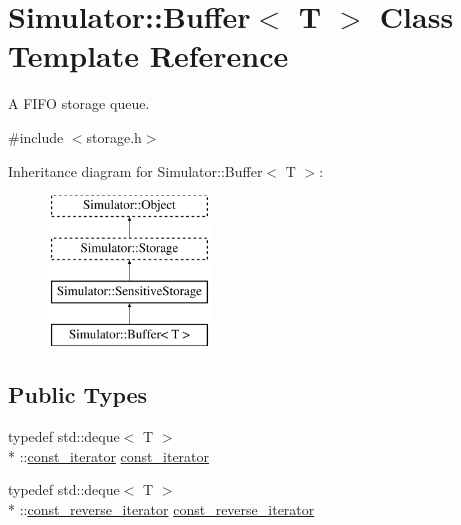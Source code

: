 \hypertarget{class_simulator_1_1_buffer}{\section{Simulator\+:\+:Buffer$<$ T $>$ Class Template Reference}
\label{class_simulator_1_1_buffer}
}


A F\+I\+F\+O storage queue.  




{\ttfamily \#include $<$storage.\+h$>$}

Inheritance diagram for Simulator\+:\+:Buffer$<$ T $>$\+:\begin{figure}[H]
\begin{center}
\leavevmode
\includegraphics[height=4.000000cm]{class_simulator_1_1_buffer}
\end{center}
\end{figure}
\subsection*{Public Types}
\begin{DoxyCompactItemize}
\item 
typedef std\+::deque$<$ T $>$\\*
\+::\hyperlink{class_simulator_1_1_buffer_a50ac4b556b0c93ce985359e10472923b}{const\+\_\+iterator} \hyperlink{class_simulator_1_1_buffer_a50ac4b556b0c93ce985359e10472923b}{const\+\_\+iterator}
\item 
typedef std\+::deque$<$ T $>$\\*
\+::\hyperlink{class_simulator_1_1_buffer_aed79765ab3f5ebbcf7399c9402634607}{const\+\_\+reverse\+\_\+iterator} \hyperlink{class_simulator_1_1_buffer_aed79765ab3f5ebbcf7399c9402634607}{const\+\_\+reverse\+\_\+iterator}
\end{DoxyCompactItemize}
